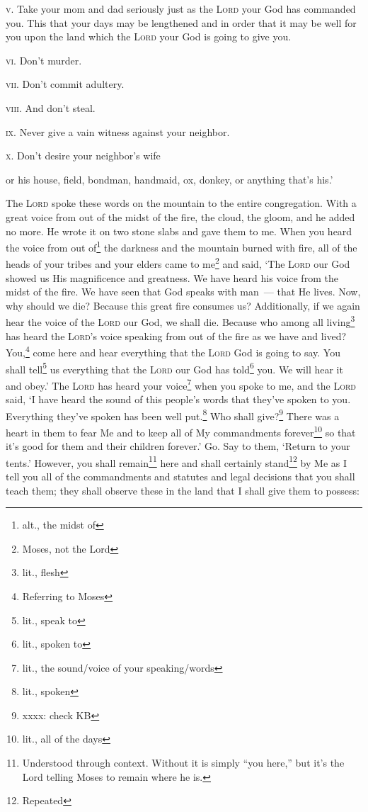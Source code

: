 \begin{inparaenum}
     \textsc{v.} Take your mom and dad seriously just as the \textsc{Lord} your God has commanded you. This that your days may be lengthened and in order that it may be well for you upon the land which the \textsc{Lord} your God is going to give you.%
    
     \textsc{vi.} Don't murder.%
    
     \textsc{vii.} Don't commit adultery.%
    
     \textsc{viii.} And don't steal.%
    
     \textsc{ix.} Never give a vain witness against your neighbor.%
    
     \textsc{x.} Don't desire your neighbor's wife
    
    or his house, field, bondman, handmaid, ox, donkey, or anything that's his.'%
    
     The \textsc{Lord} spoke these words on the mountain to the entire congregation. With a great voice from out of the midst of the fire, the cloud, the gloom, and he added no more. He wrote it on two stone slabs and gave them to me.%
     When you heard the voice from out of\footnote{alt., the midst of} the darkness and the mountain burned with fire, all of the heads of your tribes and your elders came to me\footnote{Moses, not the Lord}%
     and said, `The \textsc{Lord} our God showed us His magnificence and greatness. We have heard his voice from the midst of the fire. We have seen that God speaks with man~--- that He lives.%
     Now, why should we die? Because this great fire consumes us? Additionally, if we again hear the voice of the \textsc{Lord} our God, we shall die.%
     Because who among all living\footnote{lit., flesh} has heard the \textsc{Lord}'s voice speaking from out of the fire as we have and lived?%
     You,\footnote{Referring to Moses} come here and hear everything that the \textsc{Lord} God is going to say. You shall tell\footnote{lit., speak to} us everything that the \textsc{Lord} our God has told\footnote{lit., spoken to} you. We will hear it and obey.'%
     The \textsc{Lord} has heard your voice\footnote{lit., the sound/voice of your speaking/words} when you spoke to me, and the \textsc{Lord} said, `I have heard the sound of this people's words that they've spoken to you. Everything they've spoken has been well put.\footnote{lit., spoken}%
     Who shall give?\footnote{xxxx: check KB} There was a heart in them to fear Me and to keep all of My commandments forever\footnote{lit., all of the days} so that it's good for them and their children forever.'%
     Go. Say to them, `Return to your tents.'%
     However, you shall remain\footnote{Understood through context. Without it is simply ``you here,'' but it's the Lord telling Moses to remain where he is.} here and shall certainly stand\footnote{Repeated} by Me as I tell you all of the commandments and statutes and legal decisions that you shall teach them; they shall observe these in the land that I shall give them to possess:%
\end{inparaenum}
